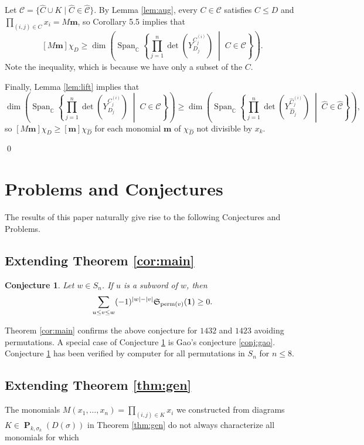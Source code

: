 \documentclass{amsart}
\newtheorem{conjecture}[theorem]{Conjecture}
\theoremstyle{definition}
\theoremstyle{named}
\newcommand*{\C}{\mathbb{C}}
\newcommand*{\Schub}{\mathfrak{S}}
\DeclareMathOperator*{\Span}{Span}
\DeclareMathOperator*{\Purple}{\mathbf{P}}
\begin{document}
Let $\mathcal{C} = \{ \widehat{C} \cup K \mid \widehat{C} \in \widehat{\mathcal{C}} \}$. By Lemma \ref{lem:aug}, every $C \in \mathcal{C}$ satisfies $C \le D$ and $\prod_{(i, j) \in C} x_i = M\mathbf{m}$, so Corollary 5.5 implies that
\[
[M\mathbf{m}]\chi_D \ge \dim \left( \textstyle \Span_\C \displaystyle \left\{ \prod_{j=1}^n \det(Y^{C^{(i)}_j}_{D_j}) \;\middle|\; C \in \mathcal{C} \right\} \right).
\]
Note the inequality, which is because we have only a subset of the $C$.

Finally, Lemma \ref{lem:lift} implies that
\[
\dim \left( \textstyle \Span_\C \displaystyle \left\{ \prod_{j=1}^n \det(Y^{C^{(i)}_j}_{D_j}) \;\middle|\; C \in \mathcal{C} \right\} \right) \ge \dim \left( \textstyle \Span_\C \displaystyle \left\{ \prod_{j=1}^n \det(Y^{\widehat{C}^{(i)}_j}_{\widehat{D}_j}) \;\middle|\; \widehat{C} \in \widehat{\mathcal{C}} \right\} \right),
\]
so $[M\mathbf{m}]\chi_D \ge [\mathbf{m}]\chi_{\widehat{D}}$ for each monomial $\mathbf{m}$ of $\chi_{\widehat{D}}$ not divisible by $x_k$.

\qed

\section{Problems and Conjectures}
\label{sec:conj}

The results of this paper naturally give rise to the following Conjectures and Problems. 

\subsection{Extending Theorem \ref{cor:main}}	\begin{conjecture} \label{conj:1.3}
		Let $w \in S_n$. If $u$ is a subword of $w$, then
$$
			\sum_{u \le v \le w} (-1)^{\left|w\right|-\left|v\right|} \Schub_{\textup{perm}(v)}({\bf 1})\geq 0.
$$
	 		\end{conjecture}

Theorem \ref{cor:main} confirms the above conjecture for $1432$ and $1423$ avoiding permutations. A special case of Conjecture \ref{conj:1.3} is Gao's conjecture \ref{conj:gao}. Conjecture \ref{conj:1.3} has been verified by computer for all permutations in $S_n$ for $n\leq 8$.

\subsection{Extending Theorem \ref{thm:gen}}	
The monomials $M(x_1, \dots, x_n) = \prod_{(i, j) \in K} x_i$ we constructed from 
	diagrams $K \in \Purple_{k, \sigma_k}(D(\sigma))$   in Theorem \ref{thm:gen} do not always characterize all monomials for which 
\end{document}
